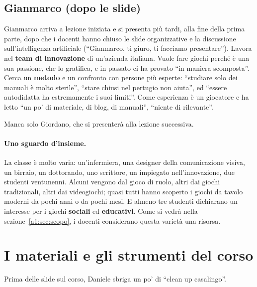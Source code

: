 \subsection{Gianmarco (dopo le slide)}

Gianmarco arriva a lezione iniziata e si presenta più tardi, alla fine della
prima parte, dopo che i docenti hanno chiuso le slide organizzative e la
discussione sull'intelligenza artificiale (``Gianmarco, ti giuro, ti facciamo
presentare''). Lavora nel \textbf{team di innovazione} di un'azienda italiana.
Vuole fare giochi perché è una sua passione, che lo gratifica, e in passato ci ha
provato ``in maniera scomposta''. Cerca un \textbf{metodo} e un confronto con
persone più esperte: ``studiare solo dei manuali è molto sterile'', ``stare
chiusi nel pertugio non aiuta'', ed ``essere autodidatta ha estremamente i suoi
limiti''. Come esperienza è un giocatore e ha letto ``un po' di materiale, di
blog, di manuali'', ``niente di rilevante''.

Manca solo Giordano, che si presenterà alla lezione successiva.

\paragraph{Uno sguardo d'insieme.} La classe è molto varia: un'infermiera,
una designer della comunicazione visiva, un birraio, un dottorando, uno
scrittore, un impiegato nell'innovazione, due studenti ventunenni. Alcuni
vengono dal gioco di ruolo, altri dai giochi tradizionali, altri dai
videogiochi; quasi tutti hanno scoperto i giochi da tavolo moderni da pochi anni
o da pochi mesi. E almeno tre studenti dichiarano un interesse per i giochi
\textbf{sociali} ed \textbf{educativi}. Come si vedrà nella
sezione~\ref{a1:sec:scopo}, i docenti considerano questa varietà una risorsa.

\section{I materiali e gli strumenti del corso}
\label{a1:sec:materiali}

Prima delle slide sul corso, Daniele sbriga un po' di ``clean up casalingo''.


